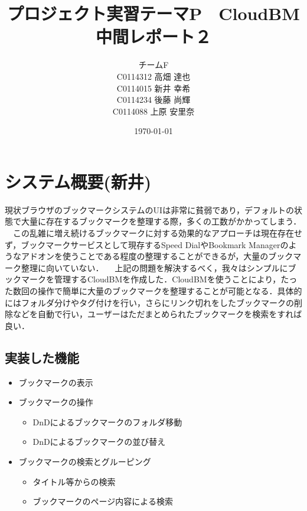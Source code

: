 \documentclass[a4paper,10pt,fleqn]{jsarticle}
\title{プロジェクト実習テーマP　CloudBM  中間レポート２}
\author{
  チームF　\\
  C0114312 高畑 達也\\
  C0114015 新井 幸希\\
  C0114234 後藤 尚輝\\
  C0114088 上原 安里奈\\
}
\date{\today}
\begin{document}
\maketitle

\section{システム概要(新井)}
現状ブラウザのブックマークシステムのUIは非常に貧弱であり，デフォルトの状態で大量に存在するブックマークを整理する際，多くの工数がかかってしまう．
　この乱雑に増え続けるブックマークに対する効果的なアプローチは現在存在せず，ブックマークサービスとして現存するSpeed DialやBookmark Managerのようなアドオンを使うことである程度の整理することができるが，大量のブックマーク整理に向いていない．
　上記の問題を解決するべく，我々はシンプルにブックマークを管理するCloudBMを作成した．CloudBMを使うことにより，たった数回の操作で簡単に大量のブックマークを整理することが可能となる．具体的にはフォルダ分けやタグ付けを行い，さらにリンク切れをしたブックマークの削除などを自動で行い，ユーザーはただまとめられたブックマークを検索をすれば良い．
\subsection{実装した機能}
\begin{itemize}
\item ブックマークの表示
\item ブックマークの操作
\begin{itemize}
\item DnDによるブックマークのフォルダ移動
\item DnDによるブックマークの並び替え
\end{itemize}
\item ブックマークの検索とグルーピング
\begin{itemize}
\item タイトル等からの検索
\item ブックマークのページ内容による検索
\end{itemize}
\end{itemize}
\end{document}

